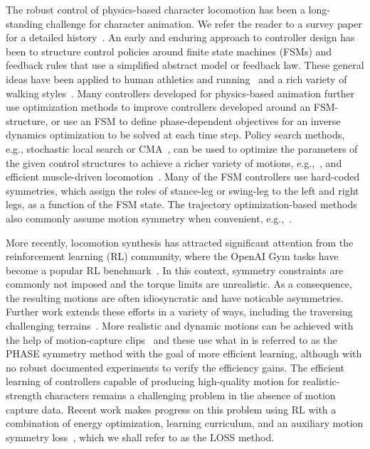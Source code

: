 % 
The robust control of physics-based character locomotion has been a long-standing challenge
for character animation. We refer the reader to a survey paper for a detailed history~\cite{STAR2012}.  
An early and enduring approach to controller design has been to structure control policies around finite state
machines (FSMs) and feedback rules that use a simplified abstract model or feedback law.  These general
ideas have been applied to human athletics and running~\cite{Hodgins95} and a rich variety of walking
styles~\cite{Yin07,Coros10,LeeYS10}. Many controllers developed for physics-based animation
further use optimization methods to improve controllers developed around an FSM-structure, or use an FSM to 
define phase-dependent objectives for an inverse dynamics optimization to be solved at each time step.
Policy search methods, e.g., stochastic local search or CMA~\cite{Hansen06}, can be used to optimize the 
parameters of the given control structures to achieve a richer variety of motions, e.g.,~\cite{Yin07,Coros11}, and
efficient muscle-driven locomotion~\cite{Wang09}.  
Many of the FSM controllers use hard-coded symmetries, which assign the roles of stance-leg or swing-leg
to the left and right legs, as a function of the FSM state.
The trajectory optimization-based methods also commonly assume motion symmetry when convenient, e.g.,~\cite{majkowska2007flipping}.


More recently, locomotion synthesis has attracted significant
attention from the reinforcement learning (RL) community, where the OpenAI Gym tasks have 
become a popular RL benchmark~\cite{ref:OpenAI-Gym}. In this context, symmetry constraints are commonly 
not imposed and the torque limits are unrealistic. As a consequence, the resulting motions are often idiosyncratic and have noticable asymmetries.
Further work extends these efforts in a variety of ways, including the traversing challenging terrains~\cite{ref:deepmindParkour}.
More realistic and dynamic motions can be achieved with the help of motion-capture clips~\cite{2017-TOG-deepLoco,2018-TOG-deepMimic} and these use what in  is referred to as the PHASE symmetry method with the goal of more efficient learning, although with
no robust documented experiments to verify the efficiency gains.
The efficient learning of controllers capable of producing high-quality motion for realistic-strength characters remains
a challenging problem in the absence of motion capture data. Recent work makes
progress on this problem using RL with a combination of energy optimization, learning curriculum, and 
an auxiliary motion symmetry loss~\cite{Yu-SIGGRAPH-2018}, which we shall refer to as the LOSS method.
% 

